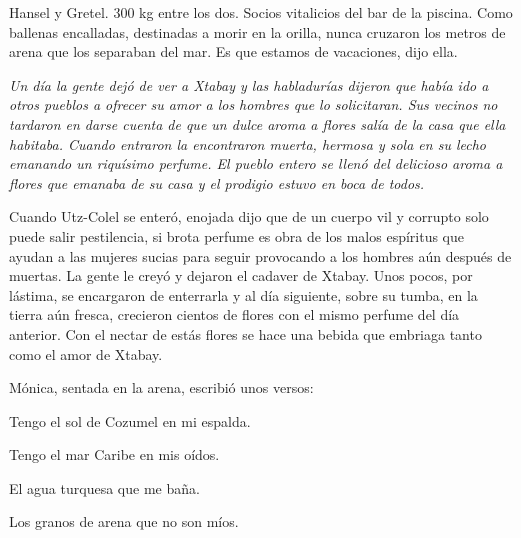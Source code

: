 \documentclass[12pt,twoside,openright,a5paper]{book}
\begin{document}
Hansel y Gretel. 300 kg entre los dos. Socios vitalicios del bar de la
piscina. Como ballenas encalladas, destinadas a morir en la orilla, nunca
cruzaron los metros de arena que los separaban del mar. Es que estamos de
vacaciones, dijo ella.


\vspace{0.5cm}
\hrulefill\hspace{0.2cm} \decofourleft\decofourright \hspace{0.2cm} \hrulefill
\vspace{0.5cm}

{\em Un día la gente dejó de ver a Xtabay y las habladurías dijeron
que había ido a otros pueblos a ofrecer su amor a los hombres que lo
solicitaran. Sus vecinos no tardaron en darse cuenta de que un dulce aroma
a flores salía de la casa que ella habitaba. Cuando entraron la encontraron
muerta, hermosa y sola en su lecho emanando un riquísimo perfume. El pueblo
entero se llenó del delicioso aroma a flores que emanaba de su casa y el
prodigio estuvo en boca de todos.

Cuando Utz-Colel se enteró, enojada dijo que de un cuerpo vil y corrupto solo
puede salir pestilencia, si brota perfume es obra de los malos espíritus
que ayudan a las mujeres sucias para seguir provocando a los hombres aún
después de muertas. La gente le creyó y dejaron el cadaver de Xtabay. Unos
pocos, por lástima, se encargaron de enterrarla y al día siguiente,
sobre su tumba, en la tierra aún fresca, crecieron cientos de flores con
el mismo perfume del día anterior. Con el nectar de estás flores se hace
una bebida que embriaga tanto como el amor de Xtabay.}


\vspace{0.5cm}
\hrulefill\hspace{0.2cm} \decofourleft\decofourright \hspace{0.2cm} \hrulefill
\vspace{0.5cm}

Mónica, sentada en la arena, escribió unos versos: 

\vspace{0.5cm}

Tengo el sol de Cozumel en mi espalda.

Tengo el mar Caribe en mis oídos.

El agua turquesa que me baña.

Los granos de arena que no son míos.
\end{document}
